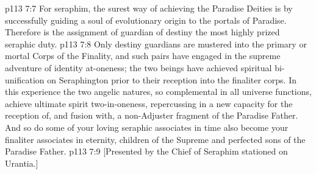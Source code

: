 \vs p113 7:7 \pc For seraphim, the surest way of achieving the Paradise Deities is by successfully guiding a soul of evolutionary origin to the portals of Paradise. Therefore is the assignment of guardian of destiny the most highly prized seraphic duty.
\vs p113 7:8 Only destiny guardians are mustered into the primary or mortal Corps of the Finality, and such pairs have engaged in the supreme adventure of identity at\hyp{}oneness; the two beings have achieved spiritual bi\hyp{}unification on Seraphington prior to their reception into the finaliter corps. In this experience the two angelic natures, so complemental in all universe functions, achieve ultimate spirit two\hyp{}in\hyp{}oneness, repercussing in a new capacity for the reception of, and fusion with, a non\hyp{}Adjuster fragment of the Paradise Father. And so do some of your loving seraphic associates in time also become your finaliter associates in eternity, children of the Supreme and perfected sons of the Paradise Father.
\vsetoff
\vs p113 7:9 [Presented by the Chief of Seraphim stationed on Urantia.]
\quizlink
